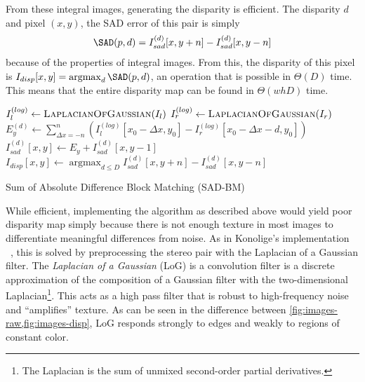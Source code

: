 \documentclass{article}
\let\orgautoref\autoref
\providecommand{\Cref}
        {\def\equationautorefname{Equation}%
         \def\figureautorefname{Figure}%
         \def\subfigureautorefname{Figure}%
         \def\Itemautorefname{Item}%
         \def\tableautorefname{Table}%
         \def\sectionautorefname{Section}%
         \def\subsectionautorefname{Section}%
         \def\subsubsectionautorefname{Section}%
         \def\chapterautorefname{Section}%
         \def\partautorefname{Part}%
         \orgautoref}
\newcommand{\proc}[1]{\textnormal{\scshape#1}}
\DeclareMathOperator*{\argmin}{argmax}
\DeclareMathOperator{\LoG}{\proc{LaplacianOfGaussian}}
\begin{document}
From these integral images, generating the disparity is efficient. The
disparity $d$ and pixel $(x, y)$, the SAD error of this pair is simply
\begin{align*}
    \SAD(p, d) = I_{sad}^{(d)}[x, y + n] - I_{sad}^{(d)}[x, y - n]
\end{align*}
because of the properties of integral images. From this, the disparity of this
pixel is $I_{disp}[x, y] = \argmin_{d} \SAD(p, d)$, an operation that is
possible in $\Theta(D)$ time. This means that the entire disparity map can be
found in $\Theta(whD)$ time.

\begin{algorithm}[t]
    $I_l^{(log)} \gets \LoG(I_l)$ \;
    $I_r^{(log)} \gets \LoG(I_r)$ \;
     {
         {
            $E_y^{(d)} \gets \sum_{\Delta x = -n}^n \left(
                          I_l^{(log)}[x_0 - \Delta x, y_0]
                          - I_r^{(log)}[x_0 - \Delta x - d, y_0] \right)$ \;
            $I_{sad}^{(d)}[x, y] \gets E_y + I_{sad}^{(d)}[x, y - 1]$ \;
        }
    }
     {
        $I_{disp}[x, y] \gets \argmin_{d \le D} I_{sad}^{(d)}[x, y + n] - I_{sad}^{(d)}[x, y - n]$ \;
    }
    \caption{Sum of Absolute Difference Block Matching (SAD-BM)}
    \label{alg:serial}
\end{algorithm}

While efficient, implementing the algorithm as described above would yield poor
disparity map simply because there is not enough texture in most images to
differentiate meaningful differences from noise. As in Konolige's
implementation ~\cite{konolige97}, this is solved by preprocessing the stereo
pair with the Laplacian of a Gaussian filter. The \textit{Laplacian of a
Gaussian} (LoG) is a convolution filter is a discrete approximation of the
composition of a Gaussian filter with the two-dimensional
Laplacian\footnote{The Laplacian is the sum of unmixed second-order partial
derivatives.}. This acts as a high pass filter that is robust to high-frequency
noise and ``amplifies'' texture. As can be seen in the difference between
\Cref{fig:images-raw,fig:images-disp}, LoG responds strongly to edges and
weakly to regions of constant color.
\end{document}
